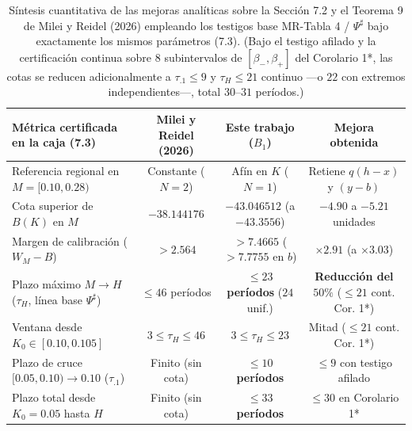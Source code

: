 \documentclass[11pt,letterpaper]{article}
\theoremstyle{plain}
\begin{document}
\begin{table}[htbp]
\centering
\small
\begin{tabular}{@{}lccc@{}}
\toprule
\textbf{Métrica certificada en la caja (7.3)} & \textbf{Milei y Reidel (2026)} & \textbf{Este trabajo ($B_1$)} & \textbf{Mejora obtenida} \\
\midrule
Referencia regional en $M=[0.10,0.28)$ & Constante ($N=2$) & Afín en $K$ ($N=1$) & Retiene $q(h-x)$ y $(y-b)$ \\
Cota superior de $B(K)$ en $M$ & $-38.144176$ & $-43.046512$ (a $-43.3556$) & $-4.90$ a $-5.21$ unidades \\
Margen de calibración ($W_M-B$) & $>2.564$ & $>7.4665$ ($>7.7755$ en $b$) & $\times 2.91$ (a $\times 3.03$) \\
Plazo máximo $M\to H$ ($\tau_H$, línea base $\Psi^\sharp$) & $\le 46$ períodos & \textbf{$\le 23$ períodos} ($24$ unif.) & \textbf{Reducción del $50\%$} ($\le 21$ cont. Cor. 1*) \\
Ventana desde $K_0\in[0.10,0.105]$ & $3\le \tau_H\le 46$ & \textbf{$3\le \tau_H\le 23$} & Mitad ($\le 21$ cont. Cor. 1*) \\
Plazo de cruce $[0.05,0.10)\to 0.10$ ($\tau_{.1}$) & Finito (sin cota) & \textbf{$\le 10$ períodos} & $\le 9$ con testigo afilado \\
Plazo total desde $K_0=0.05$ hasta $H$ & Finito (sin cota) & \textbf{$\le 33$ períodos} & $\le 30$ en Corolario 1* \\
\bottomrule
\end{tabular}
\caption{Síntesis cuantitativa de las mejoras analíticas sobre la Sección 7.2 y el Teorema 9 de Milei y Reidel (2026) empleando los testigos base MR-Tabla 4 / $\Psi^\sharp$ bajo exactamente los mismos parámetros (7.3). (Bajo el testigo afilado y la certificación continua sobre $8$ subintervalos de $[\beta_-,\beta_+]$ del Corolario 1*, las cotas se reducen adicionalmente a $\tau_{.1}\le 9$ y $\tau_H\le 21$ continuo ---o $22$ con extremos independientes---, total $30$--$31$ períodos.)}
\end{table}
\end{document}
